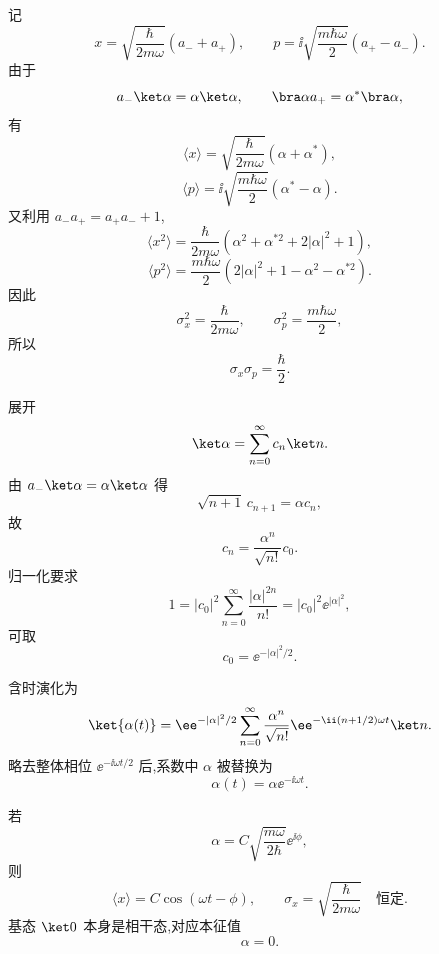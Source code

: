 \begin{solution}
记
\[
x=\sqrt{\frac{\hbar}{2m\omega}}(a_-+a_+),
\qquad
p=\ii\sqrt{\frac{m\hbar\omega}{2}}(a_+-a_-).
\]
由于
\[
a_-\ket\alpha=\alpha\ket\alpha,
\qquad
\bra\alpha a_+=\alpha^*\bra\alpha,
\]
有
\[
\langle x\rangle=\sqrt{\frac{\hbar}{2m\omega}}(\alpha+\alpha^*),
\]
\[
\langle p\rangle=\ii\sqrt{\frac{m\hbar\omega}{2}}(\alpha^*-\alpha).
\]
又利用 $a_-a_+=a_+a_-+1$,
\[
\langle x^2\rangle=\frac{\hbar}{2m\omega}
\left(\alpha^2+\alpha^{*2}+2|\alpha|^2+1\right),
\]
\[
\langle p^2\rangle=\frac{m\hbar\omega}{2}
\left(2|\alpha|^2+1-\alpha^2-\alpha^{*2}\right).
\]
因此
\[
\sigma_x^2=\frac{\hbar}{2m\omega},
\qquad
\sigma_p^2=\frac{m\hbar\omega}{2},
\]
所以
\[
\boxed{\sigma_x\sigma_p=\frac\hbar2.}
\]

展开
\[
\ket\alpha=\sum_{n=0}^{\infty}c_n\ket n.
\]
由 $a_-\ket\alpha=\alpha\ket\alpha$ 得
\[
\sqrt{n+1}\,c_{n+1}=\alpha c_n,
\]
故
\[
\boxed{c_n=\frac{\alpha^n}{\sqrt{n!}}c_0.}
\]
归一化要求
\[
1=|c_0|^2\sum_{n=0}^{\infty}\frac{|\alpha|^{2n}}{n!}
=|c_0|^2\ee^{|\alpha|^2},
\]
可取
\[
\boxed{c_0=\ee^{-|\alpha|^2/2}.}
\]

含时演化为
\[
\ket{\alpha(t)}=\ee^{-|\alpha|^2/2}
\sum_{n=0}^{\infty}\frac{\alpha^n}{\sqrt{n!}}\ee^{-\ii(n+1/2)\omega t}\ket n.
\]
略去整体相位 $\ee^{-\ii\omega t/2}$ 后,系数中 $\alpha$ 被替换为
\[
\boxed{\alpha(t)=\alpha \ee^{-\ii\omega t}.}
\]

若
\[
\alpha=C\sqrt{\frac{m\omega}{2\hbar}}\ee^{\ii\phi},
\]
则
\[
\boxed{\langle x\rangle=C\cos(\omega t-\phi)},
\qquad
\boxed{\sigma_x=\sqrt{\frac{\hbar}{2m\omega}}}\quad\text{恒定}.
\]
基态 $\ket0$ 本身是相干态,对应本征值
\[
\boxed{\alpha=0.}
\]
\end{solution}

